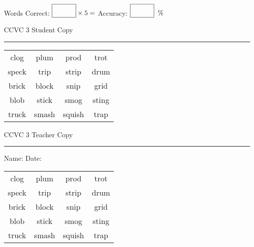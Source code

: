 \documentclass{memoir}
\begin{document}
\small

Words Correct: $\fbox{\phantom{\huge 100}} \times 5 = $ Accuracy: $\fbox{\phantom{\huge 100}}\;\; \%$ 

\vfill

\newpage


\footnotesize \noindent
CCVC 3 \hfill Student Copy
\smallskip
\hrule

\Large

\setlength{\tabcolsep}{14pt}
\def\arraystretch{3}

{\selectfont


\begin{vplace}[0.5]
\begin{center}
\begin{tabular}{cccc}
clog & plum & prod & trot \\
speck & trip & strip & drum \\
brick       & block & snip & grid \\
blob & stick & smog & sting \\
truck & smash & squish & trap \\
\end{tabular}
\end{center}
\end{vplace}

}

\newpage

\footnotesize \noindent
CCVC 3 \hfill Teacher Copy
\smallskip
\hrule

\small

\vfill

\noindent
Name: \underline{\hspace{1.75in}} \hfill Date: \underline{\hspace{1in}}

\Large

{\selectfont


\begin{vplace}[0.5]
\begin{center}
\begin{tabular}{cccc}
clog & plum & prod & trot \\
speck & trip & strip & drum \\
brick       & block & snip & grid \\
blob & stick & smog & sting \\
truck & smash & squish & trap \\
\end{tabular}
\end{center}
\end{vplace}



}
\end{document}

